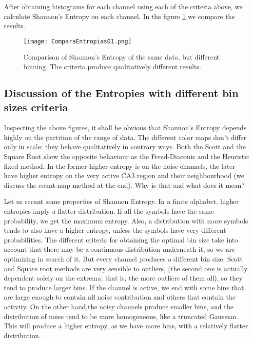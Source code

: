 \documentclass[10pt]{article}
\begin{document}
After obtaining histograms for each channel using each of the criteria above, we
calculate Shannon's Entropy on each channel. In the figure \ref{entrocomp} we compare
the results. 
\begin{figure}
  \texttt{[image: ComparaEntropias01.png]}
  \caption{Comparison of Shannon's Entropy of the same data, but
    different binning. The criteria produce qualitatively different results.}
  \label{entrocomp}
\end{figure}


\subsection{Discussion of the Entropies with different bin sizes criteria}

Inspecting the above figures, it shall be obvious that Shannon's Entropy depends highly on the partition of the range of data. The different color maps don't differ only in scale: they behave qualitatively in contrary ways. Both the Scott and the Square Root show the opposite behaviour as the Freed-Diaconis and the Heuristic fixed method. In the former higher entropy is on the noise channels, the later have higher entropy on the very active CA3 region and their neighbourhood (we discuss the count-map method at the end). Why is that and what does it mean?

Let us recant some properties of Shannon Entropy. In a finite alphabet, higher entropies imply a flatter distribution. If all the symbols have the same probability, we get the maximum entropy. Also, a distribution with more symbols tends to also have a higher entropy, unless the symbols have very different probabilities. The different criteria for obtaining the optimal bin size take into account that there may be a continuous distribution underneath it, so we are optimizing in search of it. But every channel produces a different bin size. Scott and Square root methods are very sensible to outliers, (the second one is actually dependent solely on the extrema, that is, the more outliers of them all), so they tend to produce larger bins. If the channel is active, we end with some bins that are large enough to contain all noise contribution and others that contain the activity. On the other hand,the noisy channels produce smaller bins, and the distribution of noise tend to be more homogeneous, like a truncated Gaussian. This will produce a higher entropy, as we have more bins, with a relatively flatter distribution.
\end{document}
